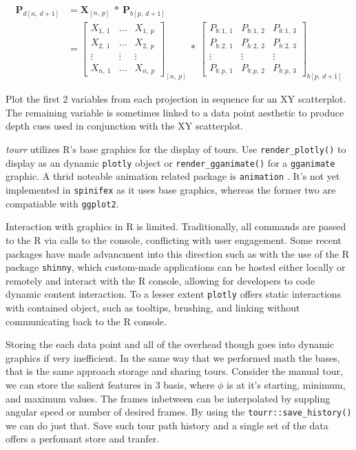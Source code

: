 \documentclass{monashthesis}
\begin{document}
\begin{align}
  \textbf{P}_{d[n,~d+1]}
    &= \textbf{X}_{[n,~p]} ~*~ \textbf{P}_{b[p,~d+1]} \\
    &= \begin{bmatrix}
      X_{1,~1} & \dots & X_{1,~p} \\
      X_{2,~1} & \dots & X_{2,~p} \\
      \vdots   & \vdots & \vdots  \\
      X_{n,~1} & \dots & X_{n,~p}
    \end{bmatrix}_{[n,~p]}
      ~*~
    \begin{bmatrix}
      P_{b:1,~1} & P_{b:1,~2} & P_{b:1,~3} \\
      P_{b:2,~1} & P_{b:2,~2} & P_{b:2,~3} \\
      \vdots     & \vdots     & \vdots     \\
      P_{b:p,~1} & P_{b:p,~2} & P_{b:p,~3}
    \end{bmatrix}_{b[p,~d+1]}
\end{align}

Plot the first 2 variables from each projection in sequence for an XY scatterplot. The remaining variable is sometimes linked to a data point aesthetic to produce depth cues used in conjunction with the XY scatterplot.

\emph{tourr} utilizes R's base graphics for the display of tours. Use \texttt{render\_plotly()} to display as an dynamic \texttt{plotly} \textcite{sievert_plotly_2018} object or \texttt{render\_gganimate()} for a \texttt{gganimate} \textcite{pedersen_gganimate:_2019} graphic. A thrid noteable animation related package is \texttt{animation} \textcite{xie_animation:_2018}. It's not yet implemented in \texttt{spinifex} as it uses base graphics, whereas the former two are compatiable with \texttt{ggplot2}.

Interaction with graphics in R is limited. Traditionally, all commands are passed to the R via calls to the console, conflicting with user engagement. Some recent packages have made advancment into this direction such as with the use of the R package \texttt{shinny}, which custom-made applications can be hosted either locally or remotely and interact with the R console, allowing for developers to code dynamic content interaction. To a lesser extent \texttt{plotly} offers static interactions with contained object, such as tooltips, brushing, and linking without communicating back to the R console.

Storing the each data point and all of the overhead though goes into dynamic graphics if very inefficient. In the same way that we performed math the bases, that is the same approach storage and sharing tours. Consider the manual tour, we can store the salient features in 3 basis, where \(\phi\) is at it's starting, minimum, and maximum values. The frames inbetween can be interpolated by suppling angular speed or number of desired frames. By using the \texttt{tourr::save\_history()} we can do just that. Save such tour path history and a single set of the data offers a perfomant store and tranfer.
\end{document}
